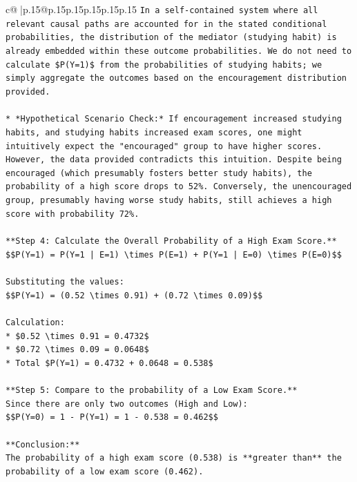 \documentclass{article}
\begin{document}
{\begin{supertabular}{c@{$\;$}|p{.15\linewidth}@{}p{.15\linewidth}p{.15\linewidth}p{.15\linewidth}p{.15\linewidth}p{.15\linewidth}}
{{{\texttt{In a self{-}contained system where all relevant causal paths are accounted for in the stated conditional probabilities, the distribution of the mediator (studying habit) is already embedded within these outcome probabilities. We do not need to calculate \$P(Y=1)\$ from the probabilities of studying habits; we simply aggregate the outcomes based on the encouragement distribution provided.} \\
\\ 
\texttt{*   *Hypothetical Scenario Check:* If encouragement increased studying habits, and studying habits increased exam scores, one might intuitively expect the "encouraged" group to have higher scores. However, the data provided contradicts this intuition. Despite being encouraged (which presumably fosters better study habits), the probability of a high score drops to 52\%. Conversely, the unencouraged group, presumably having worse study habits, still achieves a high score with probability 72\%.} \\
\\ 
\texttt{**Step 4: Calculate the Overall Probability of a High Exam Score.**} \\
\texttt{\$\$P(Y=1) = P(Y=1 | E=1) \textbackslash{}times P(E=1) + P(Y=1 | E=0) \textbackslash{}times P(E=0)\$\$} \\
\\ 
\texttt{Substituting the values:} \\
\texttt{\$\$P(Y=1) = (0.52 \textbackslash{}times 0.91) + (0.72 \textbackslash{}times 0.09)\$\$} \\
\\ 
\texttt{Calculation:} \\
\texttt{*   \$0.52 \textbackslash{}times 0.91 = 0.4732\$} \\
\texttt{*   \$0.72 \textbackslash{}times 0.09 = 0.0648\$} \\
\texttt{*   Total \$P(Y=1) = 0.4732 + 0.0648 = 0.538\$} \\
\\ 
\texttt{**Step 5: Compare to the probability of a Low Exam Score.**} \\
\texttt{Since there are only two outcomes (High and Low):} \\
\texttt{\$\$P(Y=0) = 1 {-} P(Y=1) = 1 {-} 0.538 = 0.462\$\$} \\
\\ 
\texttt{**Conclusion:**} \\
\texttt{The probability of a high exam score (0.538) is **greater than** the probability of a low exam score (0.462).} \\
}}}
\end{supertabular}}
\end{document}
